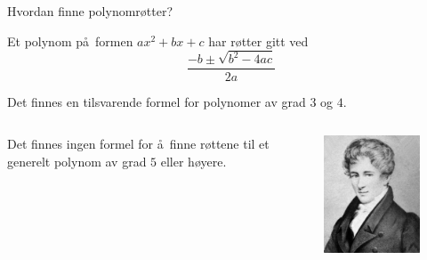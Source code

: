 \documentclass[norsk]{beamer}
\theoremstyle{example}
\begin{document}
\begin{frame}{Hvordan finne polynomrøtter?}
    \begin{lemma}
        Et polynom på formen $ax^2 + bx + c$
        har røtter gitt ved
        \[
            \frac {
                -b \pm \sqrt{b^2 - 4ac}
            }{2a}
        \]
    \end{lemma}
    \pause
    \begin{fact}
        Det finnes en tilsvarende formel for polynomer av grad $3$ og $4$.
    \end{fact}
    \pause
    \begin{columns}
        \begin{column}{.6\textwidth}
            \begin{theorem}
                Det finnes ingen formel for å finne røttene til et
                generelt polynom av grad $5$ eller høyere.
            \end{theorem}
        \end{column}
        \begin{column}{.25\textwidth}
            \begin{figure}
                \centering
                \includegraphics[width=\textwidth]{figures/abel-portrait.jpg}
            \end{figure}
        \end{column}
    \end{columns}
\end{frame}
\end{document}
